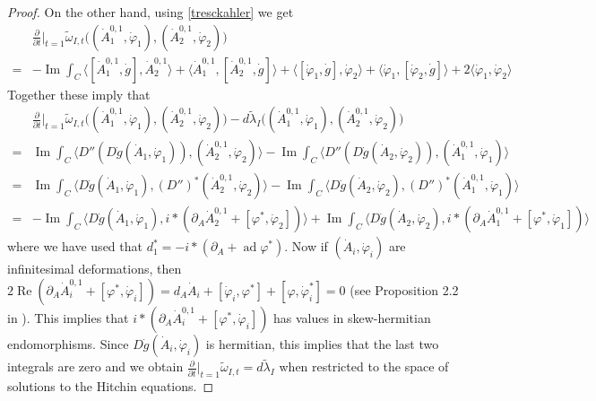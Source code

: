 \documentclass[12pt,letterpaper,reqno]{amsart}
\theoremstyle{remark}
\theoremstyle{definition}
\numberwithin{thm}{section}
\numberwithin{equation}{section}
\numberwithin{figure}{section}
\DeclareMathOperator{\ad}{ad}
\DeclareMathOperator{\im}{Im}
\DeclareMathOperator{\re}{Re}
\begin{document}
\begin{proof}
 On the other hand, using \eqref{tresckahler} we get
\begin{align*}
& \frac{\partial}{\partial t}\Bigr\vert_{t=1} \tilde\omega_{I,t} \bigl( (\dot A_1^{0,1}, \dot \varphi_1), (\dot A_2^{0,1}, \dot \varphi_2) \bigr)\\
=&  - \im  \int_C \langle  [\dot A_1^{0,1}, \dot g], \dot A_2^{0,1} \rangle + \langle  \dot A_1^{0,1}, [ \dot A_2^{0,1},  \dot g] \rangle + \langle [ \dot \varphi_1, \dot g], \dot \varphi_2 \rangle + \langle \dot \varphi_1, [\dot \varphi_2, \dot g] \rangle  + 2 \langle \dot \varphi_1, \dot \varphi_2 \rangle
\end{align*}
Together these imply that
\begin{align*}
&\frac{\partial}{\partial t}\Bigr\vert_{t=1} \tilde\omega_{I,t} \bigl( (\dot A_1^{0,1}, \dot \varphi_1), (\dot A_2^{0,1}, \dot \varphi_2) \bigr)-d \tilde \lambda_I \bigl( (\dot A_1^{0,1}, \dot \varphi_1), (\dot A_2^{0,1}, \dot \varphi_2) \bigr)\\
=&  \im \int_C \langle D'' (D \dot g(\dot A_1, \dot \varphi_1)), (\dot A_2^{0,1},\dot\varphi_2) \rangle  - \im \int_C \langle D'' (D \dot g(\dot A_2, \dot \varphi_2)), (\dot A_1^{0,1},\dot\varphi_1) \rangle  \\
=&  \im \int_C \langle D \dot g(\dot A_1, \dot \varphi_1),  (D'')^*(\dot A_2^{0,1},\dot\varphi_2) \rangle  - \im \int_C \langle  D \dot g(\dot A_2, \dot \varphi_2), (D'')^*(\dot A_1^{0,1},\dot\varphi_1) \rangle  \\
=&  - \im \int_C \langle D \dot g(\dot A_1, \dot \varphi_1), i \ast ( \partial_A \dot A_2^{0,1} + [\varphi^*, \dot \varphi_2] ) \rangle  + \im \int_C \langle D \dot g(\dot A_2, \dot \varphi_2), i \ast (\partial_A \dot A_1^{0,1} + [\varphi^*, \dot \varphi_1] )\rangle  %
\end{align*}
where we have used that $d_1^* = - i \ast (\partial_A +  \ad \varphi^*)$. 
Now if $(\dot A_i, \dot \varphi_i)$ are infinitesimal deformations, then  $2 \re (\partial_A \dot A_i^{0,1} + [\varphi^*, \dot \varphi_i]) = d_A\dot A_i + [\dot \varphi_i, \varphi^*] + [\varphi, \dot \varphi_i^*]=0$ (see Proposition 2.2 in \cite{Fredricksonasygeo}). This implies that $ i \ast (\partial_A \dot A_i^{0,1} + [\varphi^*, \dot \varphi_i])$ has values in skew-hermitian endomorphisms. Since $D \dot g(\dot A_i, \dot \varphi_i)$ is hermitian, this implies that the last two integrals are zero and we obtain $\frac{\partial}{\partial t}\Bigr\vert_{t=1} \tilde\omega_{I,t} = d \tilde \lambda_I $ when restricted to the space of solutions to the Hitchin equations.
\end{proof}
\end{document}
